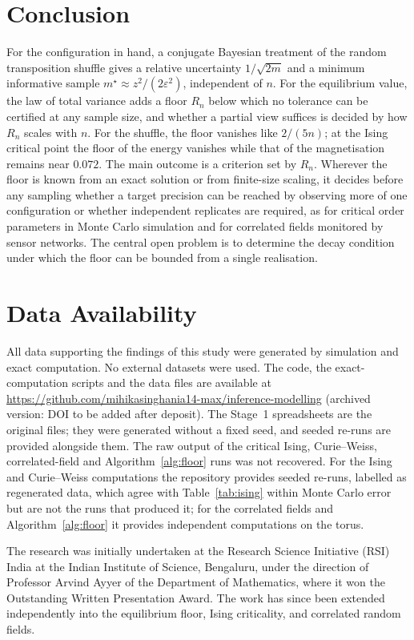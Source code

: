 \documentclass[ba,preprint]{imsart}
\theoremstyle{plain}
\theoremstyle{definition}
\begin{document}
\section{Conclusion}\label{sec:conclusion}

For the configuration in hand, a conjugate Bayesian treatment of the random transposition shuffle gives a relative uncertainty $1/\sqrt{2m}$ and a minimum informative sample $m^\star\approx z^2/(2\varepsilon^2)$, independent of $n$. For the equilibrium value, the law of total variance adds a floor $R_n$ below which no tolerance can be certified at any sample size, and whether a partial view suffices is decided by how $R_n$ scales with $n$. For the shuffle, the floor vanishes like $2/(5n)$; at the Ising critical point the floor of the energy vanishes while that of the magnetisation remains near $0.072$. The main outcome is a criterion set by $R_n$. Wherever the floor is known from an exact solution or from finite-size scaling, it decides before any sampling whether a target precision can be reached by observing more of one configuration or whether independent replicates are required, as for critical order parameters in Monte Carlo simulation and for correlated fields monitored by sensor networks. The central open problem is to determine the decay condition under which the floor can be bounded from a single realisation.


\section*{Data Availability}
All data supporting the findings of this study were generated by
simulation and exact computation. No external datasets were used.
The code, the exact-computation scripts and the data files are
available at \url{https://github.com/mihikasinghania14-max/inference-modelling}
(archived version: DOI to be added after deposit).
The Stage~1 spreadsheets are the original files; they were generated
without a fixed seed, and seeded re-runs are provided alongside them.
The raw output of the critical Ising, Curie--Weiss, correlated-field and
Algorithm~\ref{alg:floor} runs was not recovered. For the Ising and Curie--Weiss
computations the repository provides seeded re-runs, labelled as regenerated
data, which agree with Table~\ref{tab:ising} within Monte Carlo error but are
not the runs that produced it; for the correlated fields and
Algorithm~\ref{alg:floor} it provides independent computations on the torus.

\begin{acks}[Acknowledgments]
The research was initially undertaken at the Research Science Initiative (RSI) India at the Indian Institute of Science, Bengaluru, under the direction of Professor Arvind Ayyer of the Department of Mathematics, where it won the Outstanding Written Presentation Award. The work has since been extended independently into the equilibrium floor, Ising criticality, and correlated random fields.
\end{acks}



\end{document}
